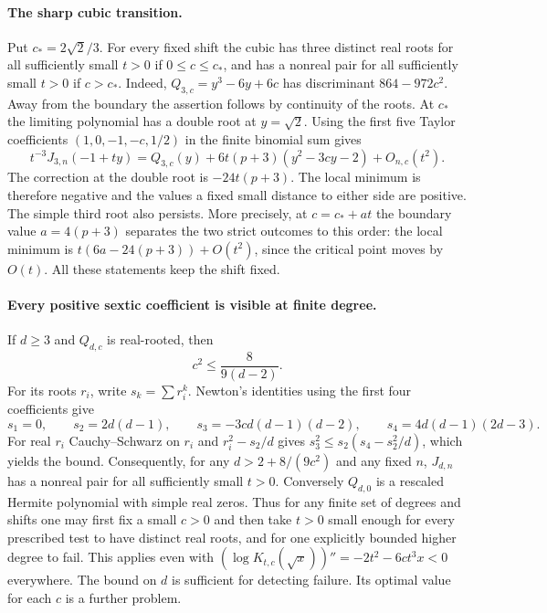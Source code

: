 \paragraph{The sharp cubic transition.}
Put $c_*=2\sqrt2/3$. For every fixed shift the cubic has three distinct
real roots for all sufficiently small $t>0$ if $0\le c\le c_*$,
and has a nonreal pair for all sufficiently small $t>0$ if $c>c_*$.
Indeed, $Q_{3,c}=y^3-6y+6c$ has discriminant $864-972c^2$. Away
from the boundary the assertion follows by continuity of the roots.
At $c_*$ the limiting polynomial has a double root at $y=\sqrt2$.
Using the first five Taylor coefficients $(1,0,-1,-c,1/2)$ in the
finite binomial sum gives
\[
 t^{-3}J_{3,n}(-1+ty)=Q_{3,c}(y)+6t(p+3)(y^2-3cy-2)+O_{n,c}(t^2).
\]
The correction at the double root is $-24t(p+3)$.
The local minimum is therefore negative and the values a fixed small
distance to either side are positive. The simple third root also persists.
More precisely, at $c=c_*+at$ the boundary value $a=4(p+3)$ separates
the two strict outcomes to this order: the local minimum is
$t(6a-24(p+3))+O(t^2)$, since the critical point moves by $O(t)$.
All these statements keep the shift fixed.

\paragraph{Every positive sextic coefficient is visible at finite degree.}
If $d\ge3$ and $Q_{d,c}$ is real-rooted, then
\[
 c^2\le\frac8{9(d-2)}.
\]
For its roots $r_i$, write $s_k=\sum r_i^k$. Newton's identities
using the first four coefficients give
\[
 s_1=0,\qquad s_2=2d(d-1),\qquad s_3=-3c d(d-1)(d-2),
 \qquad s_4=4d(d-1)(2d-3).
\]
For real $r_i$ Cauchy--Schwarz on $r_i$ and $r_i^2-s_2/d$ gives
$s_3^2\le s_2(s_4-s_2^2/d)$, which yields the bound. Consequently,
for any $d>2+8/(9c^2)$ and any fixed $n$, $J_{d,n}$ has a nonreal pair
for all sufficiently small $t>0$. Conversely $Q_{d,0}$ is a rescaled
Hermite polynomial with simple real zeros. Thus for any finite set of
degrees and shifts one may first fix a small $c>0$ and then take $t>0$
small enough for every prescribed test to have distinct real roots,
and for one explicitly bounded higher degree to fail. This applies
even with $(\log K_{t,c}(\sqrt{x}))''=-2t^2-6ct^3x<0$ everywhere.
The bound on $d$ is sufficient for detecting failure. Its optimal value
for each $c$ is a further problem.

